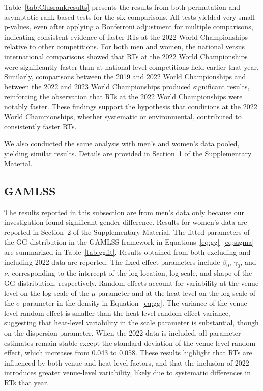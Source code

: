 \documentclass[12pt, letterpaper]{article}
\begin{document}
Table~\ref{tab:Clusrankresults} presents the results from both permutation
and asymptotic rank-based tests for the six comparisons. All tests
yielded very small p-values, even after applying a Bonferroni
adjustment for multiple comparisons, indicating consistent evidence of
faster RTs at the 2022 World Championships relative to other
competitions. For both men and women, the national versus
international comparisons showed that RTs at the 2022 World
Championships were significantly faster than at national-level
competitions held earlier that year. Similarly, comparisons between
the 2019 and 2022 World Championships and between the 2022 and 2023
World Championships produced significant results, reinforcing the
observation that RTs at the 2022 World Championships were notably
faster. These findings support the hypothesis that conditions at the
2022 World Championships, whether systematic or
environmental, contributed to consistently faster RTs.


We also conducted the same analysis with men’s and women’s data
pooled, yielding similar results. Details are provided in Section~1 of
the Supplementary Material.


\subsection{GAMLSS} \label{subsec:Results_GLMM}

The results reported in this subsection are from men's data only
because our investigation found significant gender difference.
Results for women's data are reported in Section~2 of the
Supplementary Material. The fitted parameters of the GG distribution in the
GAMLSS framework in Equations~\eqref{eq:gg}--\eqref{eq:sigma} are
summarized in Table~\ref{tab:ggfit}. Results obtained from both
excluding and including 2022 data are reported. The fixed-effect
parameters include $\beta_0$, $\gamma_0$, and $\nu$, corresponding to
the intercept of the log-location, log-scale, and shape of the GG
distribution, respectively. Random effects account for variability at
the venue level on the log-scale of the $\mu$ parameter
and at the heat level on the log-scale of the $\sigma$
parameter in the density in Equation~\eqref{eq:gg}. The variance
of the venue-level random effect is smaller than the heat-level random
effect variance, suggesting that heat-level variability in the scale
parameter is substantial, though on the dispersion parameter. When the
2022 data is included, all parameter estimates remain stable except
the standard deviation of the venue-level random-effect,
which increases from 0.043 to 0.058. These results
highlight that RTs are influenced by both venue and heat-level
factors, and that the inclusion of 2022 introduces greater venue-level
variability, likely due to systematic differences in RTs that year.
\end{document}
